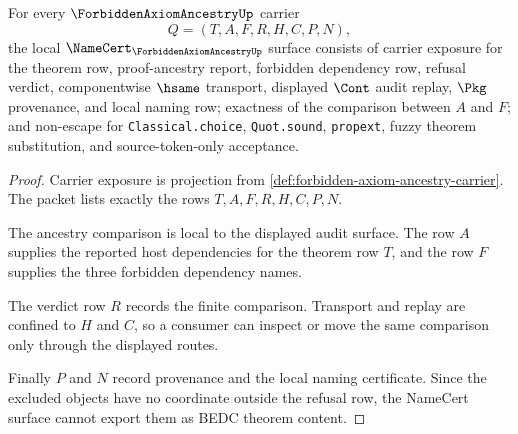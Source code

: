 \begin{theorem}
\label{thm:forbidden-axiom-ancestry-namecert-obligations}
For every $\ForbiddenAxiomAncestryUp$ carrier
$$
Q=(T,A,F,R,H,C,P,N),
$$
the local $\NameCert_{\ForbiddenAxiomAncestryUp}$ surface consists of carrier exposure for the theorem row, proof-ancestry report, forbidden dependency row, refusal verdict, componentwise $\hsame$ transport, displayed $\Cont$ audit replay, $\Pkg$ provenance, and local naming row; exactness of the comparison between $A$ and $F$; and non-escape for \texttt{Classical.choice}, \texttt{Quot.sound}, \texttt{propext}, fuzzy theorem substitution, and source-token-only acceptance.
\end{theorem}
\begin{proof}
Carrier exposure is projection from \autoref{def:forbidden-axiom-ancestry-carrier}. The packet lists exactly the rows $T,A,F,R,H,C,P,N$.

The ancestry comparison is local to the displayed audit surface. The row $A$ supplies the reported host dependencies for the theorem row $T$, and the row $F$ supplies the three forbidden dependency names.

The verdict row $R$ records the finite comparison. Transport and replay are confined to $H$ and $C$, so a consumer can inspect or move the same comparison only through the displayed routes.

Finally $P$ and $N$ record provenance and the local naming certificate. Since the excluded objects have no coordinate outside the refusal row, the NameCert surface cannot export them as BEDC theorem content.
\end{proof}

